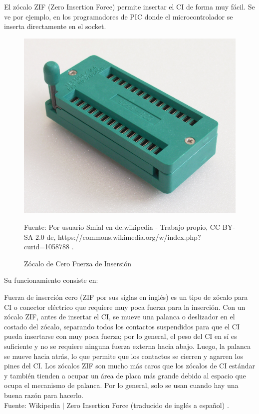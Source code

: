 \documentclass[conference]{IEEEtran}
\begin{document}
    El zócalo ZIF (Zero Insertion Force) permite insertar el CI de forma muy
    fácil. Se ve por ejemplo, en los programadores de PIC donde el
    microcontrolador se inserta directamente en el socket.

    \begin{figure}[H]
        \centering
        \includegraphics[width=0.2\paperwidth]{images/zif-socket.jpg}
        \caption{Zócalo de Cero Fuerza de Insersión} \footnotesize
        Fuente: Por usuario Smial en de.wikipedia - Trabajo propio, CC BY-SA
        2.0 de, https://commons.wikimedia.org/w/index.php?curid=1058788
        \cite{wikipedia-zif-2021}.
    \end{figure}

    \bigbreak

    Su funcionamiento consiste en:

    \bigbreak

    \begin{displayquote}
        Fuerza de inserción cero (ZIF por sus siglas en inglés) es un tipo de
        zócalo para CI o conector eléctrico que requiere muy poca fuerza para
        la inserción. Con un zócalo ZIF, antes de insertar el CI, se mueve
        una palanca o deslizador en el costado del zócalo, separando todos
        los contactos suspendidos para que el CI pueda insertarse con muy
        poca fuerza; por lo general, el peso del CI en sí es suficiente y no
        se requiere ninguna fuerza externa hacia abajo. Luego, la palanca se
        mueve hacia atrás, lo que permite que los contactos se cierren y
        agarren los pines del CI. Los zócalos ZIF son mucho más caros que los
        zócalos de CI estándar y también tienden a ocupar un área de placa
        más grande debido al espacio que ocupa el mecanismo de palanca. Por
        lo general, solo se usan cuando hay una buena razón para hacerlo.\\
        \small
        Fuente: Wikipedia $\mid$ Zero Insertion Force (traducido de inglés a
        español) \cite{wikipedia-zif-2021}.
    \end{displayquote}
\end{document}
